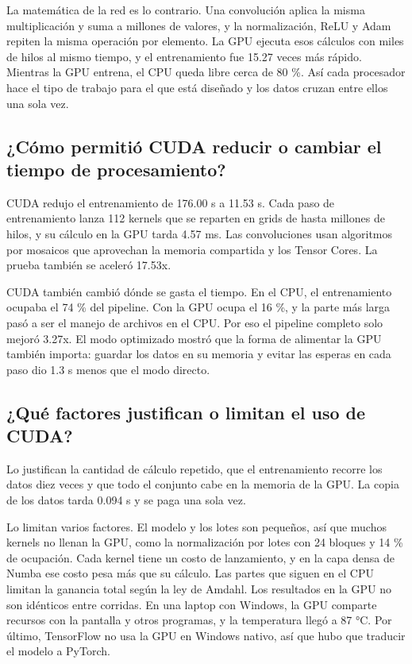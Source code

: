 \documentclass[11pt,letterpaper]{article}
\begin{document}
La matemática de la red es lo contrario. Una convolución aplica la misma multiplicación y suma a millones de valores, y la normalización, ReLU y Adam repiten la misma operación por elemento. La GPU ejecuta esos cálculos con miles de hilos al mismo tiempo, y el entrenamiento fue 15.27 veces más rápido. Mientras la GPU entrena, el CPU queda libre cerca de 80 \%. Así cada procesador hace el tipo de trabajo para el que está diseñado y los datos cruzan entre ellos una sola vez.

\subsection{¿Cómo permitió CUDA reducir o cambiar el tiempo de procesamiento?}
CUDA redujo el entrenamiento de 176.00 s a 11.53 s. Cada paso de entrenamiento lanza 112 kernels que se reparten en grids de hasta millones de hilos, y su cálculo en la GPU tarda 4.57 ms. Las convoluciones usan algoritmos por mosaicos que aprovechan la memoria compartida y los Tensor Cores. La prueba también se aceleró 17.53x.

CUDA también cambió dónde se gasta el tiempo. En el CPU, el entrenamiento ocupaba el 74 \% del pipeline. Con la GPU ocupa el 16 \%, y la parte más larga pasó a ser el manejo de archivos en el CPU. Por eso el pipeline completo solo mejoró 3.27x. El modo optimizado mostró que la forma de alimentar la GPU también importa: guardar los datos en su memoria y evitar las esperas en cada paso dio 1.3 s menos que el modo directo.

\subsection{¿Qué factores justifican o limitan el uso de CUDA?}
Lo justifican la cantidad de cálculo repetido, que el entrenamiento recorre los datos diez veces y que todo el conjunto cabe en la memoria de la GPU. La copia de los datos tarda 0.094 s y se paga una sola vez.

Lo limitan varios factores. El modelo y los lotes son pequeños, así que muchos kernels no llenan la GPU, como la normalización por lotes con 24 bloques y 14 \% de ocupación. Cada kernel tiene un costo de lanzamiento, y en la capa densa de Numba ese costo pesa más que su cálculo. Las partes que siguen en el CPU limitan la ganancia total según la ley de Amdahl. Los resultados en la GPU no son idénticos entre corridas. En una laptop con Windows, la GPU comparte recursos con la pantalla y otros programas, y la temperatura llegó a 87 °C. Por último, TensorFlow no usa la GPU en Windows nativo, así que hubo que traducir el modelo a PyTorch.
\end{document}
